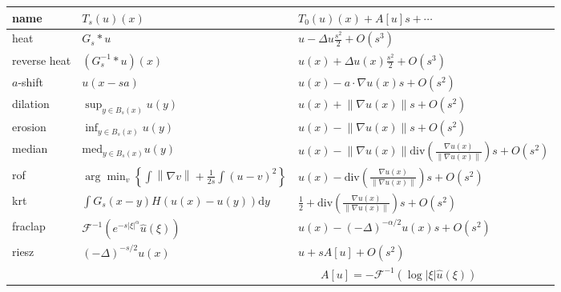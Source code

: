 \documentclass[12pt]{article}                  %
\begin{document}
\begin{tabular}{l|l|l}
	name & $T_s(u)(x)$ & $T_0(u)(x)+A[u]s+\cdots$ \\
	\hline
	heat &
	$\displaystyle G_s*u$ &
	$\displaystyle u-\Delta u\frac{s^2}2+O(s^3)$ \\
	reverse heat &
	$\displaystyle (G_s^{-1}*u)(x)$ &
	$\displaystyle u(x)+\Delta u(x)\frac{s^2}2+O(s^3)$ \\
	$a$-shift &
	$\displaystyle u(x-sa)$ &
	$\displaystyle u(x)-a\cdot\nabla u(x) s +O(s^2)$ \\
	dilation &
	$\displaystyle \sup_{y\in B_s(x)}u(y)$ &
	$\displaystyle u(x)+\left\|\nabla u(x)\right\| s +O(s^2)$ \\
	erosion &
	$\displaystyle \inf_{y\in B_s(x)}u(y)$ &
	$\displaystyle u(x)-\left\|\nabla u(x)\right\| s +O(s^2)$ \\
	median &
	$\displaystyle \mathrm{med}_{y\in B_s(x)}u(y)$ &
	$\displaystyle u(x)-\left\|\nabla u(x)\right\|\mathrm{div}\left(
	\frac{\nabla u(x)}{\left\|\nabla u(x)\right\|}
	\right)s +O(s^2)$ \\
	rof &
	$\displaystyle \arg\min_{v}\left\{\int\left\|\nabla
	v\right\|+\frac1{2s}\int(u-v)^2\right\}$ &
	$\displaystyle u(x)-\mathrm{div}\left(
	\frac{\nabla u(x)}{\left\|\nabla u(x)\right\|}
	\right)s +O(s^2)$ \\
	krt &
	$\displaystyle \int G_s(x-y)H(u(x)-u(y))\mathrm{d}y$ &
	$\frac12+\mathrm{div}\left(
	\frac{\nabla u(x)}{\left\|\nabla u(x)\right\|}
	\right)s +O(s^2)$ \\
	fraclap &
	$\displaystyle \mathcal{F}^{-1}(e^{-s|\xi|^\alpha}\hat u(\xi))$ &
	$\displaystyle u(x)-(-\Delta)^{-\alpha/2}u(x)s+O(s^2)$ \\
	riesz &
	$\displaystyle (-\Delta)^{-s/2}u(x)$ &
	$\displaystyle u+sA[u]+O(s^2)$\\
	& & $\qquad A[u] = -\mathcal{F}^{-1}(\log|\xi|\hat u(\xi))$
\end{tabular}
%
%
%
\end{document}
